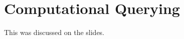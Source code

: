 %
%
%
%
%
%
%

\section{Computational Querying}\label{sec:bolquery:comp}

This was discussed on the slides.

%
%
%
%

